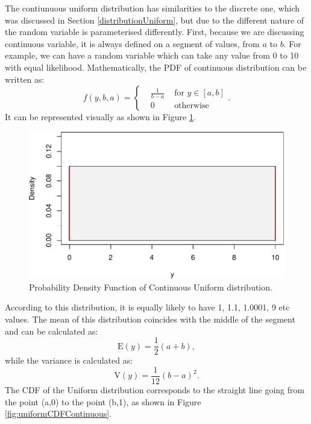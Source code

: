 \documentclass[
]{book}
\theoremstyle{definition}
\theoremstyle{definition}
\theoremstyle{definition}
\theoremstyle{definition}
\theoremstyle{remark}
\begin{document}
The contiunuous uniform distribution has similarities to the discrete one, which was discussed in Section \ref{distributionUniform}, but due to the different nature of the random variable is parameterised differently. First, because we are discussing continuous variable, it is always defined on a segment of values, from \(a\) to \(b\). For example, we can have a random variable which can take any value from 0 to 10 with equal likelihood. Mathematically, the PDF of continuous distribution can be written as:
\begin{equation}
    f(y, b, a) = \left\{\begin{aligned}
                        & \frac{1}{b-a} & \text{ for } y \in [a, b] \\
                        & 0 & \text{ otherwise }
                    \end{aligned} \right. .
    \label{eq:ContinuousUniformPDF}
\end{equation}
It can be represented visually as shown in Figure \ref{fig:uniformPDF}.

\begin{figure}
\centering
\includegraphics{Svetunkov---Statistics-for-Business-Analytics_files/figure-latex/uniformPDF-1.pdf}
\caption{\label{fig:uniformPDF}Probability Density Function of Continuous Uniform distribution.}
\end{figure}

According to this distribution, it is equally likely to have 1, 1.1, 1.0001, 9 etc values. The mean of this distribution coincides with the middle of the segment and can be calculated as:
\begin{equation}
    \mathrm{E}(y) = \frac{1}{2}(a+b) ,
    \label{eq:ContinuousUniformPDFMean}
\end{equation}
while the variance is calculated as:
\begin{equation}
    \mathrm{V}(y) = \frac{1}{12}(b-a)^2 .
    \label{eq:ContinuousUniformPDFVariance}
\end{equation}
The CDF of the Uniform distribution corresponds to the straight line going from the point (a,0) to the point (b,1), as shown in Figure \ref{fig:uniformCDFContinuous}.
\end{document}
